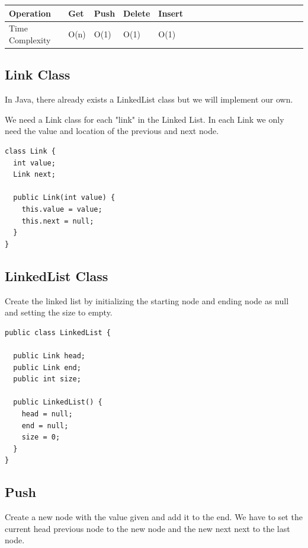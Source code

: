 \documentclass[11pt,oneside]{book}
\begin{document}
\begin{center}\begin{tabulary}{0.4\linewidth}{|l|l|l|l|l|l|l|l|l|l|l|l|l|l|l|l|l|l|l}\hline


  Operation &
  Get &
  Push &
  Delete &
  Insert\\
\hline


  Time Complexity &
  O(n) &
  O(1) &
  O(1) &
  O(1)\\

\hline\end{tabulary}\end{center}

\subsection{Link Class}

In Java, there already exists a LinkedList class but we will implement our own.

We need a Link class for each "link" in the Linked List. In each Link we only need the value and location of the previous and next node.

\begin{lstlisting}
class Link {
  int value;
  Link next;

  public Link(int value) {
    this.value = value;
    this.next = null;
  }
}
\end{lstlisting}

\subsection{LinkedList Class}

Create the linked list by initializing the starting node and ending node as null and setting the size to empty.

\begin{lstlisting}
public class LinkedList {

  public Link head;
  public Link end;
  public int size;

  public LinkedList() {
    head = null;
    end = null;
    size = 0;
  }
}
\end{lstlisting}

\subsection{Push}

Create a new node with the value given and add it to the end. We have to set the current head previous node to the new node and the new next next to the last node.
\end{document}

